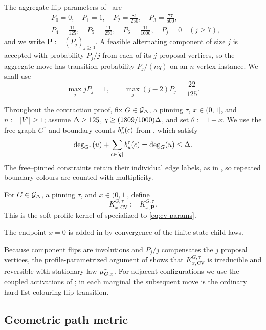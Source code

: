 The aggregate flip parameters of~\cite[Eq.~(1)]{CarlsonVigoda2024} are
\begin{equation}\label{eq:cv-params}
\begin{aligned}
  &P_0=0,\quad P_1=1,\quad P_2=\frac{81}{250},\quad
    P_3=\frac{77}{500},\\
  &P_4=\frac{11}{125},\quad P_5=\frac{11}{250},\quad
    P_6=\frac{11}{1000},\quad P_j=0\quad(j\ge7),
\end{aligned}
\end{equation}
and we write \(\boldsymbol P:=(P_j)_{j\ge0}\).  A feasible alternating
component of size \(j\) is accepted with probability \(P_j/j\) from each
of its \(j\) proposal vertices, so the aggregate move has transition
probability \(P_j/(nq)\) on an \(n\)-vertex instance.  We shall use
\[
  \max_j jP_j=1,
  \qquad
  \max_j(j-2)P_j=\frac{22}{125}.
\]

Throughout the contraction proof, fix \(G\in\mathcal{G}_{\Delta}\), a pinning
\(\tau\), \(x\in(0,1]\), and \(n:=\lvert V^\tau\rvert\ge1\); assume
\(\Delta\ge125\), \(q\ge(1809/1000)\Delta\), and set \(\theta:=1-x\).
We use the free graph \(G^\tau\) and boundary counts \(b_u^\tau(c)\)
from , which satisfy
\[
  \deg_{G^\tau}(u)+\sum_{c\in[q]}b_u^\tau(c)
  =\deg_G(u)\le\Delta.
\]
The free--pinned constraints retain their individual edge labels, as in
, so repeated boundary colours are counted
with multiplicity.

\begin{definition}\label{def:cv-kernel}
For \(G\in\mathcal{G}_{\Delta}\), a pinning \(\tau\), and \(x\in(0,1]\), define
\[
  K_{x,\mathrm{CV}}^{G,\tau}:=K_{x,\boldsymbol P}^{G,\tau}.
\]
This is the soft profile kernel of 
specialized to \eqref{eq:cv-params}.
\end{definition}

The endpoint $x=0$ is added in  by convergence of the
finite-state child laws.

Because component flips are involutions and $P_j/j$ compensates the $j$
proposal vertices, the profile-parametrized argument of
 shows that \(K_{x,\mathrm{CV}}^{G,\tau}\) is irreducible and
reversible with stationary law $\mu_{G,x}^{\tau}$.  For adjacent
configurations we use the coupled activations of
; in each marginal the subsequent
move is the ordinary hard list-colouring flip transition.

\subsection{Geometric path metric}

